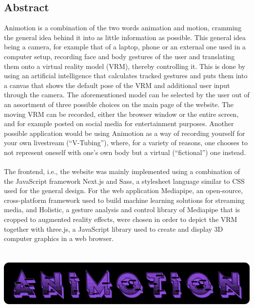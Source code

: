 \begin{spacing}{1}
    \chapter*{Abstract}
\end{spacing}
Animotion is a combination of the two words animation and motion, cramming the general idea behind it into as little information as possible. This general idea being a camera, for example that of a laptop, phone or an external one used in a computer setup, recording face and body gestures of the user and translating them onto a virtual reality model (VRM), thereby controlling it. This is done by using an artificial intelligence that calculates tracked gestures and puts them into a canvas that shows the default pose of the VRM and additional user input through the camera. The aforementioned model can be selected by the user out of an assortment of three possible choices on the main page of the website. The moving VRM can be recorded, either the browser window or the entire screen, and for example posted on social media for entertainment purposes. Another possible application would be using Animotion as a way of recording yourself for your own livestream (“V-Tubing”), where, for a variety of reasons, one chooses to not represent oneself with one’s own body but a virtual (“fictional”) one instead.
\\
\\
The frontend, i.e., the website was mainly implemented using a combination of the JavaScript framework Next.js and Sass, a stylesheet language similar to CSS used for the general design. For the web application Mediapipe, an open-source, cross-platform framework used to build machine learning solutions for streaming media, and Holistic, a gesture analysis and control library of Mediapipe that is cropped to augmented reality effects, were chosen in order to depict the VRM together with three.js, a JavaScript library used to create and display 3D computer graphics in a web browser.
\\
\\
\\
\includegraphics[width=1\textwidth]{pics/animotionlogo.png}

